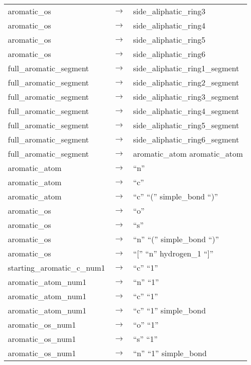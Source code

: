 \documentclass[../Document.tex]{subfiles}
\begin{document}
\begin{longtable}{m{} p{} p{}}
    aromatic\_os & $\rightarrow$ & side\_aliphatic\_ring3 \\
    aromatic\_os & $\rightarrow$ & side\_aliphatic\_ring4 \\
    aromatic\_os & $\rightarrow$ & side\_aliphatic\_ring5 \\
    aromatic\_os & $\rightarrow$ & side\_aliphatic\_ring6 \\
    full\_aromatic\_segment & $\rightarrow$ & side\_aliphatic\_ring1\_segment \\
    full\_aromatic\_segment & $\rightarrow$ & side\_aliphatic\_ring2\_segment \\
    full\_aromatic\_segment & $\rightarrow$ & side\_aliphatic\_ring3\_segment \\
    full\_aromatic\_segment & $\rightarrow$ & side\_aliphatic\_ring4\_segment \\
    full\_aromatic\_segment & $\rightarrow$ & side\_aliphatic\_ring5\_segment \\
    full\_aromatic\_segment & $\rightarrow$ & side\_aliphatic\_ring6\_segment \\
    full\_aromatic\_segment & $\rightarrow$ & aromatic\_atom aromatic\_atom \\
    aromatic\_atom & $\rightarrow$ & ``n'' \\
    aromatic\_atom & $\rightarrow$ & ``c'' \\
    aromatic\_atom & $\rightarrow$ & ``c'' ``('' simple\_bond ``)'' \\
    aromatic\_os & $\rightarrow$ & ``o'' \\
    aromatic\_os & $\rightarrow$ & ``s'' \\
    aromatic\_os & $\rightarrow$ & ``n'' ``('' simple\_bond ``)'' \\
    aromatic\_os & $\rightarrow$ & ``['' ``n'' hydrogen\_1 ``]'' \\
    starting\_aromatic\_c\_num1 & $\rightarrow$ & ``c'' ``1'' \\
    aromatic\_atom\_num1 & $\rightarrow$ & ``n'' ``1'' \\
    aromatic\_atom\_num1 & $\rightarrow$ & ``c'' ``1'' \\
    aromatic\_atom\_num1 & $\rightarrow$ & ``c'' ``1'' simple\_bond \\
    aromatic\_os\_num1 & $\rightarrow$ & ``o'' ``1'' \\
    aromatic\_os\_num1 & $\rightarrow$ & ``s'' ``1'' \\
    aromatic\_os\_num1 & $\rightarrow$ & ``n'' ``1'' simple\_bond \\

\end{longtable}
\end{document}
